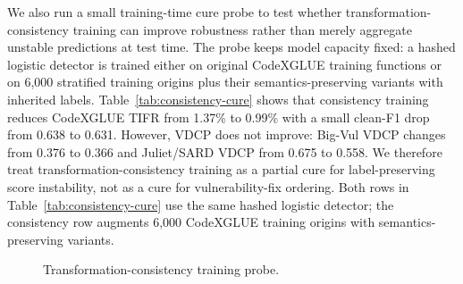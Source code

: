\documentclass[a4paper,fleqn]{cas-dc}
\begin{document}
We also run a small training-time cure probe to test whether
transformation-consistency training can improve robustness rather than merely
aggregate unstable predictions at test time. The probe keeps model capacity
fixed: a hashed logistic detector is trained either on original CodeXGLUE
training functions or on 6,000 stratified training origins plus their
semantics-preserving variants with inherited labels. Table~\ref{tab:consistency-cure}
shows that consistency training reduces CodeXGLUE TIFR from 1.37\% to 0.99\%
with a small clean-F1 drop from 0.638 to 0.631. However, VDCP does not improve:
Big-Vul VDCP changes from 0.376 to 0.366 and Juliet/SARD VDCP from 0.675 to
0.558. We therefore treat transformation-consistency training as a partial cure
for label-preserving score instability, not as a cure for vulnerability-fix
ordering.
Both rows in Table~\ref{tab:consistency-cure} use the same hashed logistic
detector; the consistency row augments 6,000 CodeXGLUE training origins with
semantics-preserving variants.

\begin{table}[t]
  \centering
  \caption{Training-time transformation-consistency cure probe.}
  \label{tab:consistency-cure}
\end{table}

\begin{figure}
  \centering
  \resizebox{\columnwidth}{!}{}
  \caption{Transformation-consistency training probe.}
  \label{fig:consistency-cure}
\end{figure}
\end{document}
